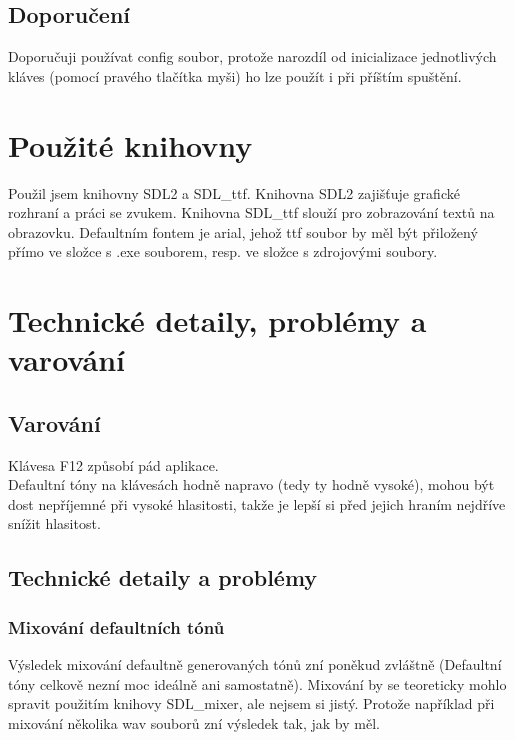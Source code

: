 \documentclass[12pt]{article}
\begin{document}
	\subsection{Doporučení}
	Doporučuji používat config soubor, protože narozdíl od inicializace jednotlivých kláves (pomocí pravého tlačítka myši) ho lze použít i při příštím spuštění.
	
	\newpage
	\maketitle\section{Použité knihovny}
	Použil jsem knihovny SDL2 a SDL\_ttf. Knihovna SDL2 zajišťuje grafické rozhraní a práci se zvukem. Knihovna SDL\_ttf slouží pro zobrazování textů na obrazovku. Defaultním fontem je arial, jehož ttf soubor by měl být přiložený přímo ve složce s .exe souborem, resp. ve složce s  zdrojovými soubory.
	
	\newpage
	\maketitle\section{Technické detaily, problémy a varování}
	\subsection{Varování}	
	Klávesa F12 způsobí pád aplikace.
	\\
	Defaultní tóny na klávesách hodně napravo (tedy ty hodně vysoké), mohou být dost nepříjemné při vysoké hlasitosti, takže je lepší si před jejich hraním nejdříve snížit hlasitost.
		
	\subsection{Technické detaily a problémy}
	\subsubsection{Mixování defaultních tónů}
	Výsledek mixování defaultně generovaných tónů zní poněkud zvláštně (Defaultní tóny celkově nezní moc ideálně ani samostatně). Mixování by se teoreticky mohlo spravit použitím knihovy SDL\_mixer, ale nejsem si jistý. Protože například při mixování několika wav souborů zní výsledek tak, jak by měl.
	
\end{document}

